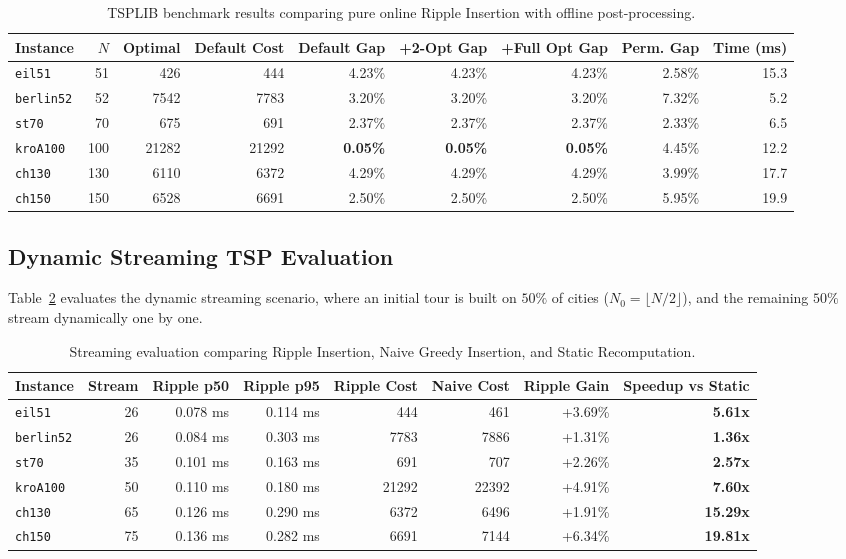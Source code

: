 \documentclass[11pt,a4paper]{article}
\theoremstyle{definition}
\begin{document}
\begin{table}[h]
\centering
\small
\begin{tabular}{lrrrrrrrr}
\toprule
Instance & $N$ & Optimal & Default Cost & Default Gap & +2-Opt Gap & +Full Opt Gap & Perm. Gap & Time (ms) \\
\midrule
\texttt{eil51} & 51 & 426 & 444 & 4.23\% & 4.23\% & 4.23\% & 2.58\% & 15.3 \\
\texttt{berlin52} & 52 & 7542 & 7783 & 3.20\% & 3.20\% & 3.20\% & 7.32\% & 5.2 \\
\texttt{st70} & 70 & 675 & 691 & 2.37\% & 2.37\% & 2.37\% & 2.33\% & 6.5 \\
\texttt{kroA100} & 100 & 21282 & 21292 & \textbf{0.05\%} & \textbf{0.05\%} & \textbf{0.05\%} & 4.45\% & 12.2 \\
\texttt{ch130} & 130 & 6110 & 6372 & 4.29\% & 4.29\% & 4.29\% & 3.99\% & 17.7 \\
\texttt{ch150} & 150 & 6528 & 6691 & 2.50\% & 2.50\% & 2.50\% & 5.95\% & 19.9 \\
\bottomrule
\end{tabular}
\caption{TSPLIB benchmark results comparing pure online Ripple Insertion with offline post-processing.}
\label{tab:tsplib}
\end{table}

\subsection{Dynamic Streaming TSP Evaluation}

Table~\ref{tab:dynamic} evaluates the dynamic streaming scenario, where an initial tour is built on $50\%$ of cities ($N_0 = \lfloor N/2 \rfloor$), and the remaining $50\%$ stream dynamically one by one.

\begin{table}[h]
\centering
\small
\begin{tabular}{lrrrrrrr}
\toprule
Instance & Stream & Ripple p50 & Ripple p95 & Ripple Cost & Naive Cost & Ripple Gain & Speedup vs Static \\
\midrule
\texttt{eil51} & 26 & 0.078 ms & 0.114 ms & 444 & 461 & +3.69\% & \textbf{5.61x} \\
\texttt{berlin52} & 26 & 0.084 ms & 0.303 ms & 7783 & 7886 & +1.31\% & \textbf{1.36x} \\
\texttt{st70} & 35 & 0.101 ms & 0.163 ms & 691 & 707 & +2.26\% & \textbf{2.57x} \\
\texttt{kroA100} & 50 & 0.110 ms & 0.180 ms & 21292 & 22392 & +4.91\% & \textbf{7.60x} \\
\texttt{ch130} & 65 & 0.126 ms & 0.290 ms & 6372 & 6496 & +1.91\% & \textbf{15.29x} \\
\texttt{ch150} & 75 & 0.136 ms & 0.282 ms & 6691 & 7144 & +6.34\% & \textbf{19.81x} \\
\bottomrule
\end{tabular}
\caption{Streaming evaluation comparing Ripple Insertion, Naive Greedy Insertion, and Static Recomputation.}
\label{tab:dynamic}
\end{table}
\end{document}
